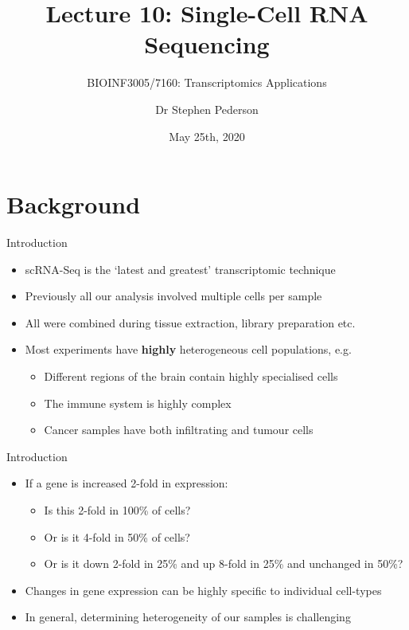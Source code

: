 \documentclass[aspectratio=169,11pt]{beamer}
\author{Dr Stephen Pederson}
\title{Lecture 10: Single-Cell RNA Sequencing}
\subtitle{BIOINF3005/7160: Transcriptomics Applications}
\institute{Bioinformatics Hub, \\The University of Adelaide}
\date{May 25th, 2020}
\begin{document}
\begin{frame}
\titlepage
\end{frame}

\begin{frame}
\footnotesize
\tableofcontents
\end{frame}


\section{Background}

\begin{frame}{Introduction}

	\begin{itemize}
		\item scRNA-Seq is the `latest and greatest' transcriptomic technique
		\item Previously all our analysis involved multiple cells per sample
		\item All were combined during tissue extraction, library preparation etc.
		\item Most experiments have \textbf{highly} heterogeneous cell populations, e.g.
		\pause
		\begin{itemize}
			\item Different regions of the brain contain highly specialised cells
			\item The immune system is highly complex
			\item Cancer samples have both infiltrating and tumour cells
		\end{itemize}
	\end{itemize}


\end{frame}

\begin{frame}{Introduction}

	\begin{itemize}
		\item If a gene is increased 2-fold in expression:
		\begin{itemize}
			\item Is this 2-fold in 100\% of cells?
			\item Or is it 4-fold in 50\% of cells?
			\item Or is it down 2-fold in 25\% and up 8-fold in 25\% and unchanged in 50\%?
		\end{itemize}
		\item Changes in gene expression can be highly specific to individual cell-types
		\item In general, determining heterogeneity of our samples is challenging
	\end{itemize}

\end{frame}
\end{document}
